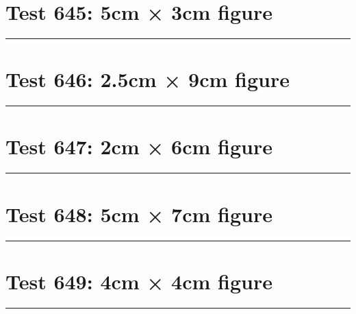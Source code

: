 \documentclass[a4paper,11pt]{article}
\begin{document}
\section*{Test 645: 5cm × 3cm figure}
\begin{swarmwrap}%
  \begin{minipage}[t]{5cm}
    \centering
    \rule{\linewidth}{3cm}
  \end{minipage}%
\end{swarmwrap}%
\swarmwrapnext
\lipsum[60]
\lipsum[61]
\lipsum[62]
\section*{Test 646: 2.5cm × 9cm figure}
\begin{swarmwrap}%
  \begin{minipage}[t]{2cm}
    \centering
    \rule{\linewidth}{9cm}
  \end{minipage}%
\end{swarmwrap}%
\swarmwrapnext
\lipsum[13]
\lipsum[14]
\lipsum[15]
\lipsum[16]
\lipsum[17]
\section*{Test 647: 2cm × 6cm figure}
\begin{swarmwrap}%
  \begin{minipage}[t]{2cm}
    \centering
    \rule{\linewidth}{6cm}
  \end{minipage}%
\end{swarmwrap}%
\swarmwrapnext
\lipsum[47]
\lipsum[48]
\lipsum[49]
\section*{Test 648: 5cm × 7cm figure}
\begin{swarmwrap}%
  \begin{minipage}[t]{5cm}
    \centering
    \rule{\linewidth}{7cm}
  \end{minipage}%
\end{swarmwrap}%
\swarmwrapnext
\lipsum[55]
\lipsum[56]
\lipsum[57]
\section*{Test 649: 4cm × 4cm figure}
\begin{swarmwrap}%
  \begin{minipage}[t]{4cm}
    \centering
    \rule{\linewidth}{4cm}
  \end{minipage}%
\end{swarmwrap}%
\swarmwrapnext
\lipsum[21]
\lipsum[22]
\lipsum[23]
\lipsum[24]
\lipsum[25]
\lipsum[26]
\end{document}
